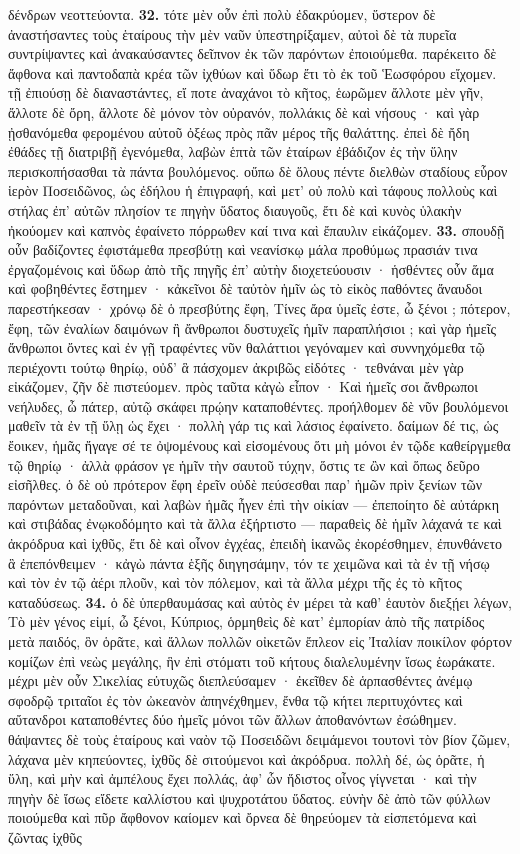 \documentclass[a4paper, 11pt, oneside, polutonikogreek, german]{article}
\begin{document}
δένδρων νεοττεύοντα. \textbf{32.} τότε μὲν οὖν ἐπὶ πολὺ ἐδακρύομεν, ὕστερον δὲ ἀναστήσαντες τοὺς ἑταίρους τὴν μὲν ναῦν ὑπεστηρίξαμεν, αὐτοὶ δὲ τὰ πυρεῖα συντρίψαντες καὶ ἀνακαύσαντες δεῖπνον ἐκ τῶν παρόντων ἐποιούμεθα. παρέκειτο δὲ ἄφθονα καὶ παντοδαπὰ κρέα τῶν ἰχθύων καὶ ὕδωρ ἔτι τὸ ἐκ τοῦ Ἑωσφόρου εἴχομεν. τῇ ἐπιούσῃ δὲ διαναστάντες, εἴ ποτε ἀναχάνοι τὸ κῆτος, ἑωρῶμεν ἄλλοτε μὲν γῆν, ἄλλοτε δὲ ὄρη, ἄλλοτε δὲ μόνον τὸν οὐρανόν, πολλάκις δὲ καὶ νήσους · καὶ γὰρ ᾐσθανόμεθα φερομένου αὐτοῦ ὀξέως πρὸς πᾶν μέρος τῆς θαλάττης. ἐπεὶ δὲ ἤδη ἐθάδες τῇ διατριβῇ ἐγενόμεθα, λαβὼν ἑπτὰ τῶν ἑταίρων ἐβάδιζον ἐς τὴν ὕλην περισκοπήσασθαι τὰ πάντα βουλόμενος. οὔπω δὲ ὅλους πέντε διελθὼν σταδίους εὗρον ἱερὸν Ποσειδῶνος, ὡς ἐδήλου ἡ ἐπιγραφή, καὶ μετ' οὐ πολὺ καὶ τάφους πολλοὺς καὶ στήλας ἐπ' αὐτῶν πλησίον τε πηγὴν ὕδατος διαυγοῦς, ἔτι δὲ καὶ κυνὸς ὑλακὴν ἠκούομεν καὶ καπνὸς ἐφαίνετο πόρρωθεν καί τινα καὶ ἔπαυλιν εἰκάζομεν. \textbf{33.} σπουδῇ οὖν βαδίζοντες ἐφιστάμεθα πρεσβύτῃ καὶ νεανίσκῳ μάλα προθύμως πρασιάν τινα ἐργαζομένοις καὶ ὕδωρ ἀπὸ τῆς πηγῆς ἐπ' αὐτὴν διοχετεύουσιν · ἡσθέντες οὖν ἅμα καὶ φοβηθέντες ἔστημεν · κἀκεῖνοι δὲ ταὐτὸν ἡμῖν ὡς τὸ εἰκὸς παθόντες ἄναυδοι παρεστήκεσαν · χρόνῳ δὲ ὁ πρεσβύτης ἔφη, Τίνες ἄρα ὑμεῖς ἐστε, ὦ ξένοι ; πότερον, ἔφη, τῶν ἐναλίων δαιμόνων ἢ ἄνθρωποι δυστυχεῖς ἡμῖν παραπλήσιοι ; καὶ γὰρ ἡμεῖς ἄνθρωποι ὄντες καὶ ἐν γῇ τραφέντες νῦν θαλάττιοι γεγόναμεν καὶ συννηχόμεθα τῷ περιέχοντι τούτῳ θηρίῳ, οὐδ' ἃ πάσχομεν ἀκριβῶς εἰδότες · τεθνάναι μὲν γὰρ εἰκάζομεν, ζῆν δὲ πιστεύομεν. πρὸς ταῦτα κἀγὼ εἶπον · Καὶ ἡμεῖς σοι ἄνθρωποι νεήλυδες, ὦ πάτερ, αὐτῷ σκάφει πρῴην καταποθέντες. προήλθομεν δὲ νῦν βουλόμενοι μαθεῖν τὰ ἐν τῇ ὕλῃ ὡς ἔχει · πολλὴ γάρ τις καὶ λάσιος ἐφαίνετο. δαίμων δέ τις, ὡς ἔοικεν, ἡμᾶς ἤγαγε σέ τε ὀψομένους καὶ εἰσομένους ὅτι μὴ μόνοι ἐν τῷδε καθείργμεθα τῷ θηρίῳ · ἀλλὰ φράσον γε ἡμῖν τὴν σαυτοῦ τύχην, ὅστις τε ὢν καὶ ὅπως δεῦρο εἰσῆλθες. ὁ δὲ οὐ πρότερον ἔφη ἐρεῖν οὐδὲ πεύσεσθαι παρ' ἡμῶν πρὶν ξενίων τῶν παρόντων μεταδοῦναι, καὶ λαβὼν ἡμᾶς ἦγεν ἐπὶ τὴν οἰκίαν --- ἐπεποίητο δὲ αὐτάρκη καὶ στιβάδας ἐνῳκοδόμητο καὶ τὰ ἄλλα ἐξήρτιστο --- παραθεὶς δὲ ἡμῖν λάχανά τε καὶ ἀκρόδρυα καὶ ἰχθῦς, ἔτι δὲ καὶ οἶνον ἐγχέας, ἐπειδὴ ἱκανῶς ἐκορέσθημεν, ἐπυνθάνετο ἃ ἐπεπόνθειμεν · κἀγὼ πάντα ἑξῆς διηγησάμην, τόν τε χειμῶνα καὶ τὰ ἐν τῇ νήσῳ καὶ τὸν ἐν τῷ ἀέρι πλοῦν, καὶ τὸν πόλεμον, καὶ τὰ ἄλλα μέχρι τῆς ἐς τὸ κῆτος καταδύσεως. \textbf{34.} ὁ δὲ ὑπερθαυμάσας καὶ αὐτὸς ἐν μέρει τὰ καθ' ἑαυτὸν διεξῄει λέγων, Τὸ μὲν γένος εἰμί, ὦ ξένοι, Κύπριος, ὁρμηθεὶς δὲ κατ' ἐμπορίαν ἀπὸ τῆς πατρίδος μετὰ παιδός, ὃν ὁρᾶτε, καὶ ἄλλων πολλῶν οἰκετῶν ἔπλεον εἰς Ἰταλίαν ποικίλον φόρτον κομίζων ἐπὶ νεὼς μεγάλης, ἣν ἐπὶ στόματι τοῦ κήτους διαλελυμένην ἴσως ἑωράκατε. μέχρι μὲν οὖν Σικελίας εὐτυχῶς διεπλεύσαμεν · ἐκεῖθεν δὲ ἁρπασθέντες ἀνέμῳ σφοδρῷ τριταῖοι ἐς τὸν ὠκεανὸν ἀπηνέχθημεν, ἔνθα τῷ κήτει περιτυχόντες καὶ αὔτανδροι καταποθέντες δύο ἡμεῖς μόνοι τῶν ἄλλων ἀποθανόντων ἐσώθημεν. θάψαντες δὲ τοὺς ἑταίρους καὶ ναὸν τῷ Ποσειδῶνι δειμάμενοι τουτονὶ τὸν βίον ζῶμεν, λάχανα μὲν κηπεύοντες, ἰχθῦς δὲ σιτούμενοι καὶ ἀκρόδρυα. πολλὴ δέ, ὡς ὁρᾶτε, ἡ ὕλη, καὶ μὴν καὶ ἀμπέλους ἔχει πολλάς, ἀφ' ὧν ἥδιστος οἶνος γίγνεται · καὶ τὴν πηγὴν δὲ ἴσως εἴδετε καλλίστου καὶ ψυχροτάτου ὕδατος. εὐνὴν δὲ ἀπὸ τῶν φύλλων ποιούμεθα καὶ πῦρ ἄφθονον καίομεν καὶ ὄρνεα δὲ θηρεύομεν τὰ εἰσπετόμενα καὶ ζῶντας ἰχθῦς 
\end{document}

